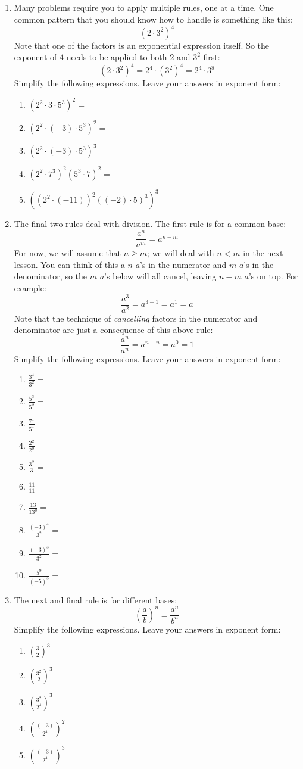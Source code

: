 \documentclass[letterpaper,12pt,fleqn]{article}
\begin{document}
\begin{enumerate}
\item Many problems require you to apply multiple rules, one at a time. One
  common pattern that you should know how to handle is something like this:
  \[(2\cdot3^2)^4\]
  Note that one of the factors is an exponential expression itself. So the
  exponent of $4$ needs to be applied to both $2$ and $3^2$ first:
  \[(2\cdot3^2)^4=2^4\cdot(3^2)^4=2^4\cdot3^8\]
  Simplify the following expressions. Leave your answers in exponent form:
  \begin{enumerate}
  \item $(2^2\cdot3\cdot5^3)^2=$
  \item $(2^2\cdot(-3)\cdot5^3)^2=$
  \item $(2^2\cdot(-3)\cdot5^3)^3=$
  \item $(2^2\cdot7^3)^2(5^3\cdot7)^2=$
  \item $((2^2\cdot(-11))^2((-2)\cdot5)^3)^3=$
  \end{enumerate}

\item The final two rules deal with division. The first rule is for a common
  base:
  \[\frac{a^n}{a^m}=a^{n-m}\]
  For now, we will assume that $n\ge m$; we will deal with $n<m$ in the next
  lesson. You can think of this a $n$ $a$'s in the numerator and $m$ $a$'s in
  the denominator, so the $m$ $a$'s below will all cancel, leaving $n-m$ $a$'s
  on top. For example:
  \[\frac{a^3}{a^2}=a^{3-1}=a^1=a\]
  Note that the technique of \emph{cancelling} factors in the numerator and
  denominator are just a consequence of this above rule:
  \[\frac{a^n}{a^n}=a^{n-n}=a^0=1\]
  Simplify the following expressions. Leave your answers in exponent form:
  \begin{enumerate}
  \item $\frac{3^4}{3^2}=$
  \item $\frac{5^3}{5^3}=$
  \item $\frac{7^1}{5^1}=$
  \item $\frac{2^2}{2^0}=$
  \item $\frac{3^2}{3}=$
  \item $\frac{11}{11}=$
  \item $\frac{13}{13^0}=$
  \item $\frac{(-3)^4}{3^2}=$
  \item $\frac{(-3)^3}{3^2}=$
  \item $\frac{5^9}{(-5)^5}=$
  \end{enumerate}

\item The next and final rule is for different bases:
  \[\left(\frac{a}{b}\right)^n=\frac{a^n}{b^n}\]
  Simplify the following expressions. Leave your answers in exponent form:
  \begin{enumerate}
    \item $\left(\frac{3}{2}\right)^3$
    \item $\left(\frac{3^2}{2}\right)^3$
    \item $\left(\frac{3^2}{2^4}\right)^3$
    \item $\left(\frac{(-3)}{2^4}\right)^2$
    \item $\left(\frac{(-3)}{2^4}\right)^3$
  \end{enumerate}


\end{enumerate}
\end{document}
